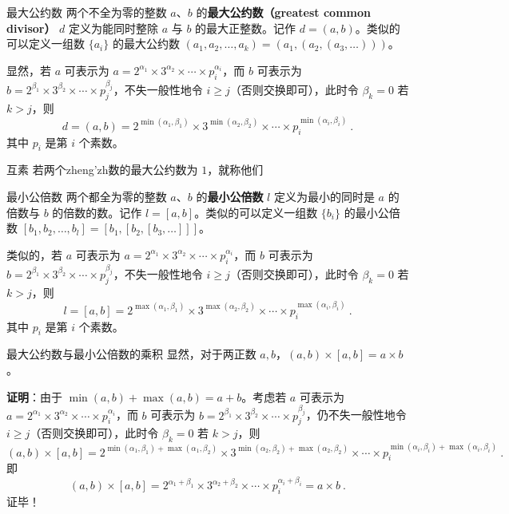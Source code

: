 
\begin{definition}{最大公约数}
两个不全为零的整数 $a$、$b$ 的\textbf{最大公约数（greatest common divisor）} $d$ 定义为能同时整除 $a$ 与 $b$ 的最大正整数。记作 $d = (a, b)$。类似的可以定义一组数 $\{a_i\}$ 的最大公约数 $(a_1, a_2, \dots, a_k) = (a_1, (a_2, (a_3, \dots)))$。
\end{definition}
显然，若 $a$ 可表示为 $a = 2^{\alpha_1} \times 3^{\alpha_2} \times \cdots \times p_i^{\alpha_i}$，而 $b$ 可表示为 $b = 2^{\beta_1} \times 3^{\beta_2} \times \cdots \times p_j^{\beta_j}$，不失一般性地令 $i \ge j$（否则交换即可），此时令 $\beta_k = 0$ 若 $k > j$，则
\begin{equation}
d = (a, b) = 2^{\min(\alpha_1, \beta_1)} \times 3^{\min(\alpha_2, \beta_2)} \times \cdots \times p_i^{\min(\alpha_i, \beta_i)} ~.
\end{equation}
其中 $p_i$ 是第 $i$ 个素数。

\begin{definition}{互素}
若两个zheng'zh数的最大公约数为 $1$，就称他们
\end{definition}

\begin{definition}{最小公倍数}
两个都全为零的整数 $a$、$b$ 的\textbf{最小公倍数} $l$ 定义为最小的同时是 $a$ 的倍数与 $b$ 的倍数的数。记作 $l = [a, b]$。类似的可以定义一组数 $\{b_i\}$ 的最小公倍数 $[b_1, b_2, \dots, b_l] = [b_1, [b_2, [b_3, \dots]]]$。
\end{definition}
类似的，若 $a$ 可表示为 $a = 2^{\alpha_1} \times 3^{\alpha_2} \times \cdots \times p_i^{\alpha_i}$，而 $b$ 可表示为 $b = 2^{\beta_1} \times 3^{\beta_2} \times \cdots \times p_j^{\beta_j}$，不失一般性地令 $i \ge j$（否则交换即可），此时令 $\beta_k = 0$ 若 $k > j$，则
\begin{equation}
l = [a, b] = 2^{\max(\alpha_1, \beta_1)} \times 3^{\max(\alpha_2, \beta_2)} \times \cdots \times p_i^{\max(\alpha_i, \beta_i)} ~.
\end{equation}
其中 $p_i$ 是第 $i$ 个素数。

\begin{theorem}{最大公约数与最小公倍数的乘积}
显然，对于两正数 $a, b$，$(a, b) \times [a, b] = a \times b$。
\end{theorem}
\textbf{证明}：由于 $\min(a, b) + \max(a, b) =a + b$。考虑若 $a$ 可表示为 $a = 2^{\alpha_1} \times 3^{\alpha_2} \times \cdots \times p_i^{\alpha_i}$，而 $b$ 可表示为 $b = 2^{\beta_1} \times 3^{\beta_2} \times \cdots \times p_j^{\beta_j}$，仍不失一般性地令 $i \ge j$（否则交换即可），此时令 $\beta_k = 0$ 若 $k > j$，则
\begin{equation}
(a, b) \times  [a, b] = 2^{\min(\alpha_1, \beta_1) + \max(\alpha_1, \beta_2)} \times 3^{\min(\alpha_2, \beta_2) + \max(\alpha_2, \beta_2)} \times \cdots \times p_i^{\min(\alpha_i, \beta_i) + \max(\alpha_i, \beta_i)} ~.
\end{equation}
即
\begin{equation}
(a,b) \times [a, b] = 2^{\alpha_1 + \beta_1} \times 3^{\alpha_2 + \beta_2} \times \cdots \times p_i^{\alpha_i + \beta_i} = a \times b ~.
\end{equation}
证毕！
